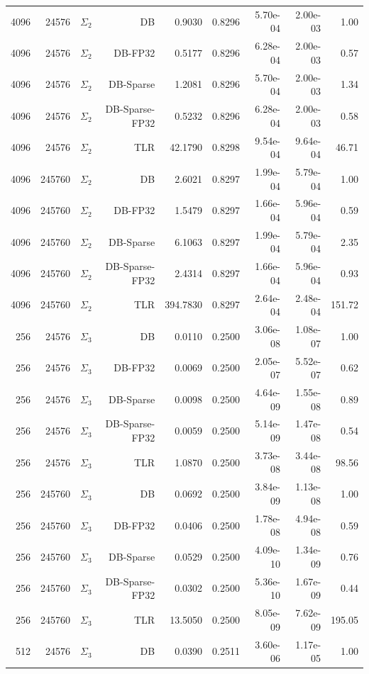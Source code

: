 \begin{tabular}{|r|r|r|r|r|r|r|r|r|}
  4096 & 24576 & $\Sigma_2$ & DB & 0.9030 & 0.8296 & 5.70e-04 & 2.00e-03 & 1.00 \\
  4096 & 24576 & $\Sigma_2$ & DB-FP32 & 0.5177 & 0.8296 & 6.28e-04 & 2.00e-03 & 0.57 \\
  4096 & 24576 & $\Sigma_2$ & DB-Sparse & 1.2081 & 0.8296 & 5.70e-04 & 2.00e-03 & 1.34 \\
  4096 & 24576 & $\Sigma_2$ & DB-Sparse-FP32 & 0.5232 & 0.8296 & 6.28e-04 & 2.00e-03 & 0.58 \\
  4096 & 24576 & $\Sigma_2$ & TLR & 42.1790 & 0.8298 & 9.54e-04 & 9.64e-04 & 46.71 \\
  4096 & 245760 & $\Sigma_2$ & DB & 2.6021 & 0.8297 & 1.99e-04 & 5.79e-04 & 1.00 \\
  4096 & 245760 & $\Sigma_2$ & DB-FP32 & 1.5479 & 0.8297 & 1.66e-04 & 5.96e-04 & 0.59 \\
  4096 & 245760 & $\Sigma_2$ & DB-Sparse & 6.1063 & 0.8297 & 1.99e-04 & 5.79e-04 & 2.35 \\
  4096 & 245760 & $\Sigma_2$ & DB-Sparse-FP32 & 2.4314 & 0.8297 & 1.66e-04 & 5.96e-04 & 0.93 \\
  4096 & 245760 & $\Sigma_2$ & TLR & 394.7830 & 0.8297 & 2.64e-04 & 2.48e-04 & 151.72 \\
  256 & 24576 & $\Sigma_3$ & DB & 0.0110 & 0.2500 & 3.06e-08 & 1.08e-07 & 1.00 \\
  256 & 24576 & $\Sigma_3$ & DB-FP32 & 0.0069 & 0.2500 & 2.05e-07 & 5.52e-07 & 0.62 \\
  256 & 24576 & $\Sigma_3$ & DB-Sparse & 0.0098 & 0.2500 & 4.64e-09 & 1.55e-08 & 0.89 \\
  256 & 24576 & $\Sigma_3$ & DB-Sparse-FP32 & 0.0059 & 0.2500 & 5.14e-09 & 1.47e-08 & 0.54 \\
  256 & 24576 & $\Sigma_3$ & TLR & 1.0870 & 0.2500 & 3.73e-08 & 3.44e-08 & 98.56 \\
  256 & 245760 & $\Sigma_3$ & DB & 0.0692 & 0.2500 & 3.84e-09 & 1.13e-08 & 1.00 \\
  256 & 245760 & $\Sigma_3$ & DB-FP32 & 0.0406 & 0.2500 & 1.78e-08 & 4.94e-08 & 0.59 \\
  256 & 245760 & $\Sigma_3$ & DB-Sparse & 0.0529 & 0.2500 & 4.09e-10 & 1.34e-09 & 0.76 \\
  256 & 245760 & $\Sigma_3$ & DB-Sparse-FP32 & 0.0302 & 0.2500 & 5.36e-10 & 1.67e-09 & 0.44 \\
  256 & 245760 & $\Sigma_3$ & TLR & 13.5050 & 0.2500 & 8.05e-09 & 7.62e-09 & 195.05 \\
  512 & 24576 & $\Sigma_3$ & DB & 0.0390 & 0.2511 & 3.60e-06 & 1.17e-05 & 1.00 \\

\end{tabular}
